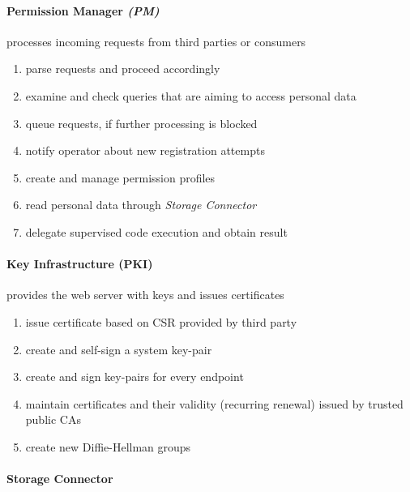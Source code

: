 \documentclass[12pt,english,a4paper,titlepage,cleardoublepage=empty,dottedtoc]{report}
\providecommand{\tightlist}{%
  \setlength{\itemsep}{0pt}\setlength{\parskip}{0pt}}
\begin{document}
\paragraph{\texorpdfstring{Permission Manager
\emph{(PM)}}{Permission Manager (PM)}}\label{permission-manager-pm}

processes incoming requests from third parties or consumers

\begin{enumerate}
\def\labelenumi{\alph{enumi})}
\tightlist
\item
  parse requests and proceed accordingly
\item
  examine and check queries that are aiming to access personal data
\item
  queue requests, if further processing is blocked
\item
  notify operator about new registration attempts
\item
  create and manage permission profiles
\item
  read personal data through \emph{Storage Connector}
\item
  delegate supervised code execution and obtain result
\end{enumerate}

\paragraph{Key Infrastructure (PKI)}\label{key-infrastructure-pki}

provides the web server with keys and issues certificates

\begin{enumerate}
\def\labelenumi{\alph{enumi})}
\tightlist
\item
  issue certificate based on CSR provided by third party
\item
  create and self-sign a system key-pair
\item
  create and sign key-pairs for every endpoint
\item
  maintain certificates and their validity (recurring renewal) issued by
  trusted public CAs
\item
  create new Diffie-Hellman groups
\end{enumerate}

\paragraph{Storage Connector}\label{storage-connector-1}
\end{document}
